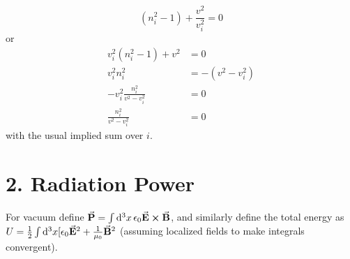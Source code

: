 \documentclass[a4paper,twoside]{article}
\begin{document}
\begin{itemize}
\begin{problem}
            \begin{equation}
                (n_i^2 - 1) + \frac{v^2}{v_i^2} = 0
            \end{equation}
            or
            \begin{align}
                v_i^2 (n_i^2 - 1) + v^2 &= 0 \\
                v_i^2 n_i^2 &= - (v^2 - v_i^2) \\
                - v_i^2 \frac{n_i^2}{v^2 - v_i^2} &= 0 \\
                \frac{n_i^2}{v^2 - v_i^2} &= 0
            \end{align}
            with the usual implied sum over $ i $.
        \end{problem}
\end{itemize}

\section*{2. Radiation Power}
For vacuum define $ \va{P} = \int \dd[3]{x} \epsilon_0 \va{E} \cross \va{B} $, and similarly define the total energy as $ U = \frac{1}{2}\int \dd[3]{x[\epsilon_0 \va{E}^2 + \frac{1}{\mu_0} \va{B}^2} $ (assuming localized fields to make integrals convergent).
\end{document}
